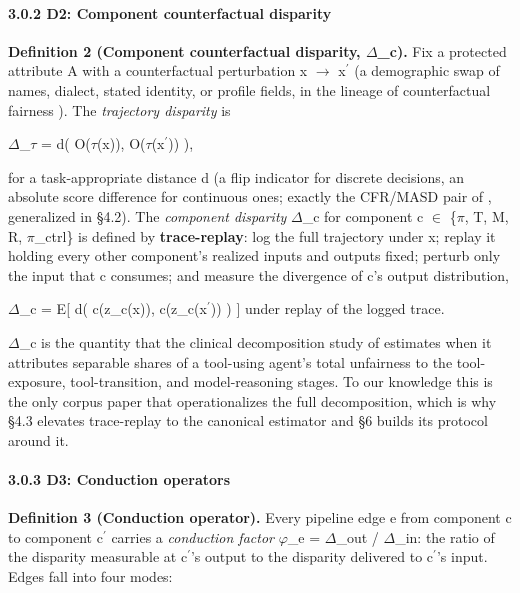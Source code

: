 \documentclass[10pt]{article}
\begin{document}
\paragraph*{3.0.2 D2: Component counterfactual disparity}

\textbf{Definition 2 (Component counterfactual disparity, $\Delta$\_c).} Fix a protected attribute A with a counterfactual perturbation x $\rightarrow$ x$^{\prime}$ (a demographic swap of names, dialect, stated identity, or profile fields, in the lineage of counterfactual fairness \cite{kusner2017counterfactual}). The \emph{trajectory disparity} is

$\Delta$\_$\tau$ = d( O($\tau$(x)), O($\tau$(x$^{\prime}$)) ),

for a task-appropriate distance d (a flip indicator for discrete decisions, an absolute score difference for continuous ones; exactly the CFR/MASD pair of \cite{mayilvaghanan2026counterfactual}, generalized in \S{}4.2). The \emph{component disparity} $\Delta$\_c for component c $\in$ \{$\pi$, T, M, R, $\pi$\_ctrl\} is defined by \textbf{trace-replay}: log the full trajectory under x; replay it holding every other component's realized inputs and outputs fixed; perturb only the input that c consumes; and measure the divergence of c's output distribution,

$\Delta$\_c = E[ d( c(z\_c(x)), c(z\_c(x$^{\prime}$)) ) ] under replay of the logged trace.

$\Delta$\_c is the quantity that the clinical decomposition study of \cite{xu2026ducx} estimates when it attributes separable shares of a tool-using agent's total unfairness to the tool-exposure, tool-transition, and model-reasoning stages. To our knowledge this is the only corpus paper that operationalizes the full decomposition, which is why \S{}4.3 elevates trace-replay to the canonical estimator and \S{}6 builds its protocol around it.

\paragraph*{3.0.3 D3: Conduction operators}

\textbf{Definition 3 (Conduction operator).} Every pipeline edge e from component c to component c$^{\prime}$ carries a \emph{conduction factor} $\varphi$\_e = $\Delta$\_out / $\Delta$\_in: the ratio of the disparity measurable at c$^{\prime}$'s output to the disparity delivered to c$^{\prime}$'s input. Edges fall into four modes:
\end{document}
